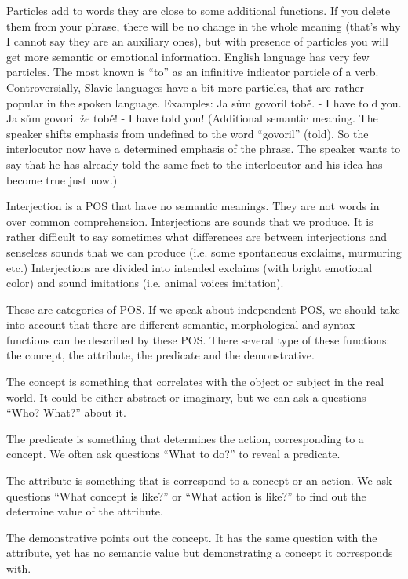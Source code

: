 Particles add to words they are close to some additional functions. If you delete them from your phrase, there will be no change in the whole meaning (that’s why I cannot say they are an auxiliary ones), but with presence of particles you will get more semantic or emotional information. English language has very few particles. The most known is “to” as an infinitive indicator particle of a verb. Controversially, Slavic languages have a bit more particles, that are rather popular in the spoken language. 
Examples:
Ja sům govoril tobě. - I have told you.
Ja sům govoril že tobě! - I have told you! (Additional semantic meaning. The speaker shifts emphasis from undefined to the word “govoril” (told). So the interlocutor now have a determined emphasis of the phrase. The speaker wants to say that he has already told the same fact to the interlocutor and his idea has become true just now.) 

Interjection is a POS that have no semantic meanings. They are not words in over common comprehension. Interjections are sounds that we produce. It is rather difficult to say sometimes what differences are between interjections and senseless sounds that we can produce (i.e. some spontaneous exclaims, murmuring etc.) Interjections are divided into intended exclaims (with bright emotional color) and sound imitations (i.e. animal voices imitation).

These are categories of POS. If we speak about independent POS, we should take into account that there are different semantic, morphological and syntax functions can be described by these POS. There several type of these functions: the concept, the attribute, the predicate and the demonstrative.

The concept is something that correlates with the object or subject in the real world. It could be either abstract or imaginary, but we can ask a questions “Who? What?” about it.

The predicate is something that determines the action, corresponding to a concept. We often ask questions “What to do?” to reveal a predicate.

The attribute is something that is correspond to a concept or an action. We ask questions “What concept is like?” or “What action is like?” to find out the determine value of the attribute.

The demonstrative points out the concept. It has the same question with the attribute, yet has no semantic value but demonstrating a concept it corresponds with. 

